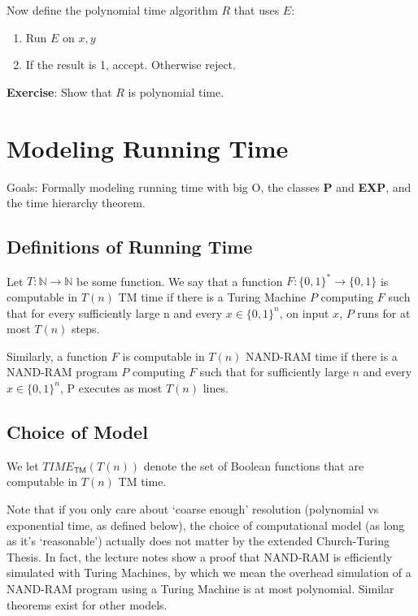 \documentclass[11pt]{article}
\theoremstyle{definition}
\theoremstyle{remark}
\begin{document}
\noindent Now define the polynomial time algorithm $R$ that uses $E$:
\begin{enumerate}
\item Run $E$ on $x,y$
\item If the result is 1, accept. Otherwise reject.
\end{enumerate}

\noindent \textbf{Exercise}: Show that $R$ is polynomial time.\\


\section{Modeling Running Time}

Goals: Formally modeling running time with big O, the classes \textbf{P} and \textbf{EXP}, and the time hierarchy theorem.

\subsection{Definitions of Running Time} Let $T: \mathbb{N} \rightarrow \mathbb{N}$ be some function. We say that a function $F: \{0, 1\}^* \rightarrow \{0,1\}$ is computable in $T(n)$ TM time if there is a Turing Machine $P$ computing $F$ such that for every sufficiently large n and every $x \in \{0, 1 \}^n$, on input $x$, $P$ runs for at most $T(n)$ steps.

Similarly, a function $F$ is computable in $T(n)$ NAND-RAM time if there is a NAND-RAM program $P$ computing $F$ such that for sufficiently large $n$ and every $x \in \{0, 1\}^n$, P executes as most $T(n)$ lines.

\subsection{Choice of Model}
We let  $TIME_{\mathsf{TM}}(T(n))$ denote the set of Boolean functions that are computable in $T(n)$ TM time.

Note that if you only care about `coarse enough' resolution (polynomial vs exponential time, as defined below), the choice of computational model (as long as it's `reasonable') actually does not matter by the extended Church-Turing Thesis.
In fact, the lecture notes show a proof that NAND-RAM is efficiently simulated with Turing Machines, by which we mean the overhead simulation of a NAND-RAM program using a Turing Machine is at most polynomial.
Similar theorems exist for other models.
\end{document}
